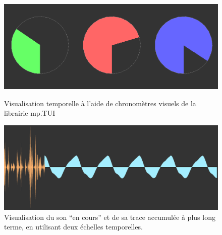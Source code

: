\begin{figure}[!htbp]
	\captionsetup{format=plain}%
	\centering
	\begin{minipage}[t]{0.48\textwidth}
		\includegraphics[width=\linewidth]{gfx/06_visual_representation/mpTUI-DialButton.png}
		\caption[Visualisation temporelle à l'aide de chronomètres visuels]{Visualisation temporelle à l'aide de chronomètres visuels de la librairie mp.TUI}
		\label{fig:visual_representation:dialButton}
	\end{minipage}
	\hspace{.02\linewidth}
	\begin{minipage}[t]{0.48\textwidth}
	    \includegraphics[width=\linewidth]{gfx/06_visual_representation/LAM-DSW.png}
		\caption[Deux échelles temporelles différentes d'un flux audio]{Visualisation du son ``en cours'' et de sa trace accumulée à plus long terme, en utilisant deux échelles temporelles.}
		\label{fig:visual_representation:DSW}
	\end{minipage}
\end{figure}

